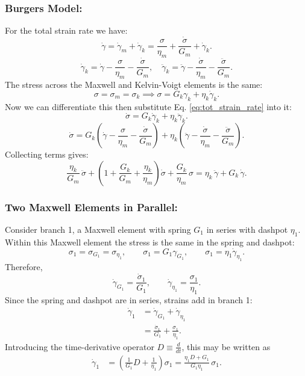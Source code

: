 \subsubsection{Burgers Model:}
For the total strain rate we have:
\begin{equation*}
	\dot\gamma = \dot\gamma_m + \dot\gamma_k
	= \frac{\sigma}{\eta_m} + \frac{\dot\sigma}{G_m} + \dot\gamma_k.
\end{equation*}
\begin{equation*}
	\dot\gamma_k = \dot\gamma - \frac{\sigma}{\eta_m} - \frac{\dot\sigma}{G_m}, \quad
	\ddot\gamma_k = \ddot\gamma - \frac{\dot\sigma}{\eta_m} - \frac{\ddot\sigma}{G_m}.
	\label{eq:tot_strain_rate}
\end{equation*}
The stress across the Maxwell and Kelvin-Voigt elements is the same:
\begin{equation*}
	\sigma = \sigma_m = \sigma_k
	\implies
	\sigma = G_k\gamma_k + \eta_k \dot\gamma_k.
\end{equation*}
Now we can differentiate this then substitute Eq. \ref{eq:tot_strain_rate} into it:
\begin{equation*}
	\dot\sigma = G_k \dot\gamma_k + \eta_k \ddot\gamma_k.
\end{equation*}
\begin{equation*}
	\dot\sigma
	= G_k \left(\dot\gamma - \frac{\sigma}{\eta_m} - \frac{\dot\sigma}{G_m}\right)
	+ \eta_k \left(\ddot\gamma - \frac{\dot\sigma}{\eta_m} - \frac{\ddot\sigma}{G_m}\right).
\end{equation*}
Collecting terms gives:
\begin{equation}
	\frac{\eta_k}{G_m}\,\ddot\sigma
	+ \left(1 + \frac{G_k}{G_m} + \frac{\eta_k}{\eta_m}\right)\dot\sigma
	+ \frac{G_k}{\eta_m}\,\sigma
	= \eta_k\,\ddot\gamma + G_k\,\dot\gamma.
	\label{eq:burgers_model}
\end{equation}


\subsubsection{Two Maxwell Elements in Parallel:}
Consider branch 1, a Maxwell element with spring $G_1$ in series with dashpot $\eta_1$.
Within this Maxwell element the stress is the same in the spring and dashpot:
\[
	\sigma_1 = \sigma_{G_1} = \sigma_{\eta_1},
	\qquad
	\sigma_1 = G_1 \gamma_{G_1},
	\qquad
	\sigma_1 = \eta_1 \dot\gamma_{\eta_1}.
\]
Therefore,
\[
	\dot\gamma_{G_1} = \frac{\dot\sigma_1}{G_1},
	\qquad
	\dot\gamma_{\eta_1} = \frac{\sigma_1}{\eta_1}.
\]
Since the spring and dashpot are in series, strains add in branch 1:
\begin{align*}
	\dot\gamma_1 &= \dot\gamma_{G_1} + \dot\gamma_{\eta_1} \\
	&= \frac{\dot\sigma_1}{G_1} + \frac{\sigma_1}{\eta_1}.
\end{align*}
Introducing the time-derivative operator $D \equiv \frac{d}{dt}$, this may be written as
\begin{align*}
	\dot\gamma_1 &= \left(\frac{1}{G_1}D + \frac{1}{\eta_1}\right)\sigma_1
	= \frac{\eta_1 D + G_1}{G_1\eta_1}\,\sigma_1.
\end{align*}

